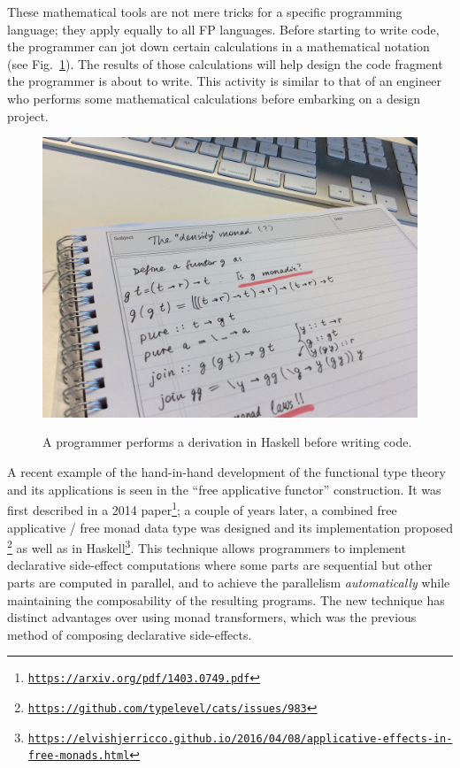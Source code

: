These mathematical tools are not mere tricks for a specific programming
language; they apply equally to all FP languages. Before starting
to write code, the programmer can jot down certain calculations in
a mathematical notation (see Fig.\ \ref{fig:Example-calculation-in-type-theory}).
The results of those calculations will help design the code fragment
the programmer is about to write. This activity is similar to that
of an engineer who performs some mathematical calculations before
embarking on a design project.\begin{figure}%
\begin{centering}
{\footnotesize{}\vspace{-0.5\baselineskip}
\includegraphics[width=0.6\linewidth]{ftt-example}\vspace{-0.5\baselineskip}
}{\footnotesize\par}
\par\end{centering}
{\footnotesize{}\caption{A programmer performs a derivation in Haskell before writing code.\label{fig:Example-calculation-in-type-theory}}
}{\footnotesize\par}

\vspace{-0.5\baselineskip}
\end{figure}%
A recent example of the hand-in-hand development of the functional
type theory and its applications is seen in the ``free applicative
functor'' construction. It was first described in a 2014 paper\footnote{\texttt{\href{https://arxiv.org/pdf/1403.0749.pdf}{https://arxiv.org/pdf/1403.0749.pdf}}};
a couple of years later, a combined free applicative / free monad
data type was designed and its implementation proposed \footnote{\texttt{\href{https://github.com/typelevel/cats/issues/983}{https://github.com/typelevel/cats/issues/983}}}
as well as in Haskell\footnote{\texttt{\href{https://elvishjerricco.github.io/2016/04/08/applicative-effects-in-free-monads.html}{https://elvishjerricco.github.io/2016/04/08/applicative-effects-in-free-monads.html}}}.
This technique allows programmers to implement declarative side-effect
computations where some parts are sequential but other parts are computed
in parallel, and to achieve the parallelism \emph{automatically} while
maintaining the composability of the resulting programs. The new technique
has distinct advantages over using monad transformers, which was the
previous method of composing declarative side-effects.


